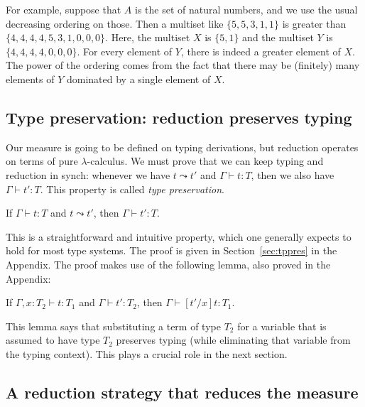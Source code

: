 \documentclass{article}
\begin{document}
For example, suppose that $A$ is the set of natural numbers, and we use the usual decreasing ordering on those.  Then
a multiset like $\{ 5, 5, 3 , 1 , 1 \}$ is greater than $\{ 4 , 4 , 4 , 4 , 5 , 3 , 1 , 0 , 0 , 0 \}$.  Here, the
multiset $X$ is $\{ 5, 1 \}$ and the multiset $Y$ is $\{ 4 , 4 , 4 , 4 , 0 , 0 , 0 \}$.  For every element of $Y$,
there is indeed a greater element of $X$.  The power of the ordering comes from the fact that there may be (finitely) many
elements of $Y$ dominated by a single element of $X$.

\subsection{Type preservation: reduction preserves typing}

Our measure is going to be defined on typing derivations, but reduction
operates on terms of pure $\lambda$-calculus.  We must prove that we can
keep typing and reduction in synch: whenever we have $t \leadsto t'$ and
$\Gamma \vdash t : T$, then we also have $\Gamma \vdash t' : T$.  This
property is called \emph{type preservation}.

\vspace{.25cm}
\begin{theorem}
\label{thm:tppres}
If $\Gamma\vdash t : T$ and $t \leadsto t'$, then $\Gamma\vdash t' : T$.
\end{theorem}

This is a straightforward and intuitive property, which one generally
expects to hold for most type systems.  The proof is given in Section~\ref{sec:tppres}
in the Appendix.  The proof makes use of the following lemma, also proved in the Appendix:

\vspace{.25cm}
\begin{lemma}[Substitution]
\label{lem:stlcsubst}
If $\Gamma, x:T_2 \vdash t : T_1$ and $\Gamma \vdash t' : T_2$, then
$\Gamma \vdash [t'/x]t : T_1$.
\end{lemma}

\noindent This lemma says that substituting a term of type $T_2$ for a variable that
is assumed to have type $T_2$ preserves typing (while eliminating that
variable from the typing context).  This plays a crucial role in the next section.

\subsection{A reduction strategy that reduces the measure}
\label{sec:mudec}
\end{document}
